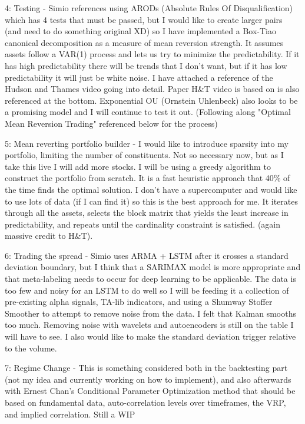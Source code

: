\documentclass[11pt]{article}
\begin{document}
4: Testing - Simio references using ARODs (Absolute Rules Of Disqualification) which has 4 tests that must be passed, but I would like to create larger pairs (and need to do something original XD) so I have implemented a Box-Tiao canonical decomposition as a measure of mean reversion strength. It assumes assets follow a VAR(1) process and lets us try to minimize the predictability. If it has high predictability there will be trends that I don't want, but if it has low predictability it will just be white noise. I have attached a reference of the Hudson and Thames video going into detail. Paper H\&T video is based on is also referenced at the bottom. Exponential OU (Ornstein Uhlenbeck) also looks to be a promising model and I will continue to test it out. (Following along "Optimal Mean Reversion Trading" referenced below for the process)

5: Mean reverting portfolio builder - I would like to introduce sparsity into my portfolio, limiting the number of constituents. Not so necessary now, but as I take this live I will add more stocks. I will be using a greedy algorithm to construct the portfolio from scratch. It is a fast heuristic approach that 40\% of the time finds the optimal solution. I don't have a supercomputer and would like to use lots of data (if I can find it) so this is the best approach for me. It iterates through all the assets, selects the block matrix that yields the least increase in predictability, and repeats until the cardinality constraint is satisfied. (again massive credit to H\&T).

6: Trading the spread - Simio uses ARMA + LSTM after it crosses a standard deviation boundary, but I think that a SARIMAX model is more appropriate and that meta-labeling needs to occur for deep learning to be applicable. The data is too few and noisy for an LSTM to do well so I will be feeding it a collection of pre-existing alpha signals, TA-lib indicators, and using a Shumway Stoffer Smoother to attempt to remove noise from the data. I felt that Kalman smooths too much. Removing noise with wavelets and autoencoders is still on the table I will have to see. I also would like to make the standard deviation trigger relative to the volume.

7: Regime Change - This is something considered both in the backtesting part (not my idea and currently working on how to implement), and also afterwards with Ernest Chan's Conditional Parameter Optimization method that should be based on fundamental data, auto-correlation levels over timeframes, the VRP, and implied correlation. Still a WIP
\end{document}
